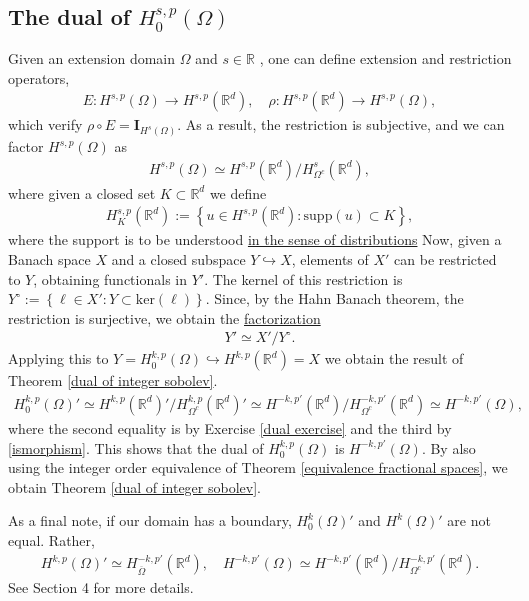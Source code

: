 \documentclass[
    a4paper,
    DIV=14,
    abstract=true,
    numbers=noenddot
]
{scrartcl}
\theoremstyle{definition}
\newcommand{\set}[1]{\left\{#1\right\}}
\newcommand{\Id}{\bm{I}}\renewcommand{\ker}{\bm{ker}}\newcommand{\supp}[1]{\bm{supp}(#1)}\renewcommand{\tr}[1]{\mathrm{tr}\left(#1\right)}
\newcommand{\rm}[1]{\mathrm{#1}}
\newcommand{\R}{\mathbb{R}}
\begin{document}
\subsection{The dual of $H^{s,p}_0(\Omega)$}
Given an extension domain $\Omega $ and $s \in \R$ , one can define extension and restriction operators,
\begin{align*}
  E:H^{s,p}(\Omega ) \to H^{s,p}(\R^d), \quad \rho: H^{s,p}(\R^d) \to H^{s,p}(\Omega ),
\end{align*}
which verify $\rho \circ E = \Id_{H^s(\Omega )}$. As a result, the restriction is subjective, and we can factor $H^{s,p}(\Omega )$ as
\begin{align}\label{ismorphism}
  H^{s,p}(\Omega )\simeq H^{s,p}(\R^d)\slash H^s_{\Omega^c}(\R^d ),
\end{align}
where given a closed set $K \subset \R^d$ we define
\begin{align*}
  H^{s,p}_K(\R^d):= \set{u \in H^{s,p}(\R^d): \rm{supp}(u) \subset K},
\end{align*}
where the support is to be understood \href{https://nowheredifferentiable.com/2023-07-12-PDEs-3-Sobolev_spaces/#:~:text=Support%20of%20a%20distribution}{in the sense of distributions}
Now, given a Banach space $X$ and a closed subspace $Y \hookrightarrow X$, elements of $X'$ can be restricted to $Y$, obtaining functionals in $Y'$. The kernel of this restriction is $Y^\circ:=\set{\ell \in X': Y \subset \rm{ker}(\ell)}$. Since, by the Hahn Banach theorem, the restriction is surjective, we obtain the \href{https://math.la.asu.edu/~quigg/teach/courses/578/2008/notes/adjoints.pdf}{factorization}
\begin{align}\label{dual isomormphism}
  Y' \simeq X'\slash Y^\circ.
\end{align}
Applying this to $Y= H^{k,p}_0(\Omega )\hookrightarrow H^{k,p}(\R^d) =X$ we obtain the result of Theorem \ref{dual of integer sobolev}.
\begin{align*}
  H^{k,p}_0(\Omega )' \simeq H^{k,p}(\R^d)'\slash H^{k,p}_{\Omega^c}(\R^d)'\simeq H^{-k,p'}(\R^d)\slash H^{-k,p'}_{\Omega^c}(\R^d )\simeq H^{-k,p'}(\Omega ),
\end{align*}
where the second equality is by Exercise \ref{dual exercise} and the third by \eqref{ismorphism}.
This shows that the dual of $H^{k,p}_0(\Omega )$ is $H^{-k,p'}(\Omega )$. By also using the integer order equivalence of Theorem \ref{equivalence fractional spaces}, we obtain  Theorem \ref{dual of integer sobolev}.

As a final note, if our domain has a boundary, $H_0^k(\Omega )'$ and $H^k(\Omega )'$ are not equal. Rather,
\begin{align*}
  H^{k,p}(\Omega )'\simeq H_{\overline{\Omega } }^{-k,p'}(\R^d), \quad H^{-k,p'}(\Omega ) \simeq H^{-k,p'}(\R^d)\slash H^{-k,p'}_{{\Omega }^c }(\R^d).
\end{align*}
See \cite{taylor2013partial} Section 4 for more details.
\end{document}
